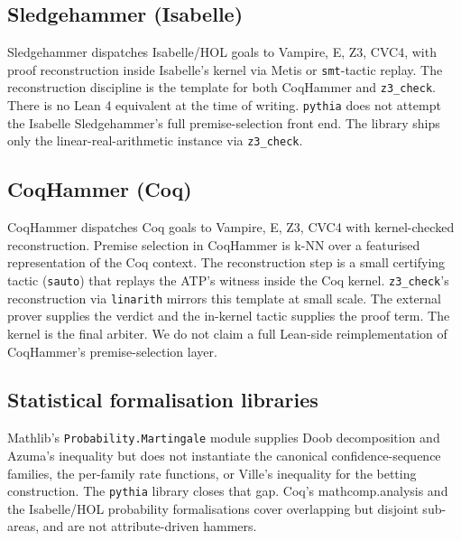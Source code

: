 \subsection{Sledgehammer (Isabelle)}
Sledgehammer
\citep{paulsonblanchette2010threeyears, blanchettesledgehammer2011}
dispatches Isabelle/HOL goals to Vampire, E, Z3, CVC4, with proof
reconstruction inside Isabelle's kernel via Metis or
\texttt{smt}-tactic replay. The reconstruction discipline is the
template for both CoqHammer and \texttt{z3\_check}. There is no Lean
4 equivalent at the time of writing. \texttt{pythia} does not
attempt the Isabelle Sledgehammer's full premise-selection front
end. The library ships only the linear-real-arithmetic instance via
\texttt{z3\_check}.

\subsection{CoqHammer (Coq)}
CoqHammer \citep{czajkakaliszyk2018coqhammer} dispatches Coq goals
to Vampire, E, Z3, CVC4 with kernel-checked reconstruction. Premise
selection in CoqHammer is k-NN over a featurised representation of
the Coq context. The reconstruction step is a small certifying tactic
(\texttt{sauto}) that replays the ATP's witness inside the Coq
kernel. \texttt{z3\_check}'s reconstruction via \texttt{linarith}
mirrors this template at small scale. The external prover supplies
the verdict and the in-kernel tactic supplies the proof term. The
kernel is the final arbiter. We do not claim a full Lean-side reimplementation of
CoqHammer's premise-selection layer.

\subsection{Statistical formalisation libraries}
Mathlib's \texttt{Probability.Martingale} module supplies Doob
decomposition and Azuma's inequality but does not instantiate the
canonical confidence-sequence families, the per-family rate
functions, or Ville's inequality for the betting construction.
The \texttt{pythia} library closes that gap. Coq's
mathcomp.analysis and the Isabelle/HOL probability
formalisations cover overlapping but disjoint sub-areas, and
are not attribute-driven hammers.

